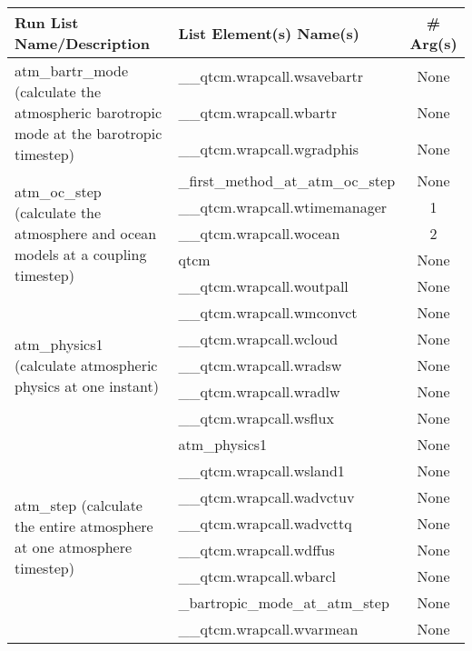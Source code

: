 

\begin{longtable}{l|lc}
\textbf{Run List Name/Description} & \textbf{List Element(s) Name(s)} & 
                                                   \textbf{\# Arg(s)} \\
\hline
\endhead
\multirow{3}{*}{\parbox{0.4\linewidth}{atm\_bartr\_mode (calculate the atmospheric barotropic mode at the barotropic timestep)}} & \_\_qtcm.wrapcall.wsavebartr & None \\
         & \_\_qtcm.wrapcall.wbartr & None \\
         & \_\_qtcm.wrapcall.wgradphis & None \\
\hline
\multirow{5}{*}{\parbox{0.4\linewidth}{atm\_oc\_step (calculate the atmosphere and ocean models at a coupling timestep)}} & \_first\_method\_at\_atm\_oc\_step & None \\
         & \_\_qtcm.wrapcall.wtimemanager & 1\\
         & \_\_qtcm.wrapcall.wocean & 2\\
         & qtcm & None \\
         & \_\_qtcm.wrapcall.woutpall & None \\
\hline
\multirow{5}{*}{\parbox{0.4\linewidth}{atm\_physics1 (calculate atmospheric physics at one instant)}} & \_\_qtcm.wrapcall.wmconvct & None \\
         & \_\_qtcm.wrapcall.wcloud & None \\
         & \_\_qtcm.wrapcall.wradsw & None \\
         & \_\_qtcm.wrapcall.wradlw & None \\
         & \_\_qtcm.wrapcall.wsflux & None \\
\hline
\multirow{8}{*}{\parbox{0.4\linewidth}{atm\_step (calculate the entire atmosphere at one atmosphere timestep)}} & atm\_physics1 & None \\
         & \_\_qtcm.wrapcall.wsland1 & None \\
         & \_\_qtcm.wrapcall.wadvctuv & None \\
         & \_\_qtcm.wrapcall.wadvcttq & None \\
         & \_\_qtcm.wrapcall.wdffus & None \\
         & \_\_qtcm.wrapcall.wbarcl & None \\
         & \_bartropic\_mode\_at\_atm\_step & None \\
         & \_\_qtcm.wrapcall.wvarmean & None \\

\end{longtable}
